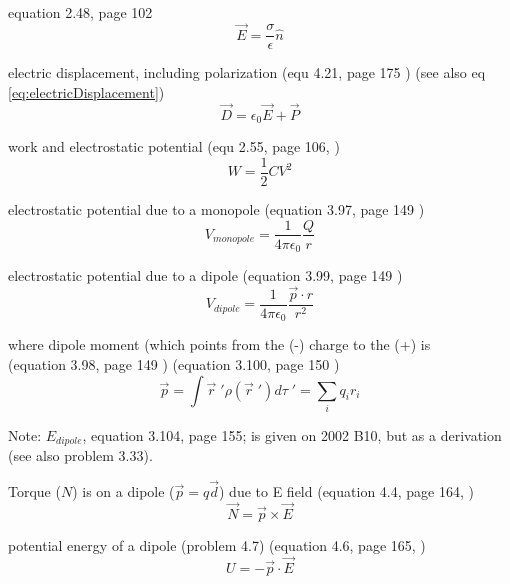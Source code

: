 \documentclass[12pt]{article}  %
\begin{document}
equation 2.48, page 102 \cite{GriffithED}
\begin{equation}
\vec{E} = \frac{\sigma}{\epsilon} \hat{n}
\end{equation}


electric displacement, including polarization (equ 4.21, page 175 \cite{GriffithED})
(see also eq \ref{eq:electricDisplacement})
\begin{equation}
\vec{D} = \epsilon_0 \vec{E} + \vec{P}
\label{eq:electricDisplacementwithPolarization}
\end{equation}

work and electrostatic potential (equ 2.55, page 106, \cite{GriffithED})
\begin{equation}
  W = \frac{1}{2} C V^2
	\label{eq:workCapacitor}
\end{equation}

electrostatic potential due to a monopole (equation 3.97, page 149  \cite{GriffithED})
\begin{equation}
V_{monopole} = \frac{1}{4 \pi \epsilon_0} \frac{Q}{r}
\end{equation}

electrostatic potential due to a dipole (equation 3.99, page 149  \cite{GriffithED})
\begin{equation}
V_{dipole} = \frac{1}{4 \pi \epsilon_0} \frac{\vec{p}\cdot \hat{r}}{r^2}
\end{equation}

where dipole moment (which points from the (-) charge to the (+) is \\ 
(equation 3.98, page 149  \cite{GriffithED}) (equation 3.100, page 150  \cite{GriffithED})
\begin{equation}
\vec{p} = \int \vec{r} \; ' \rho ( \vec{r}\;' ) d \tau \;' = \sum_i q_i r_i
\end{equation}

Note: $E_{dipole}$, equation 3.104, page 155; is given on 2002 B10,
but as a derivation (see also problem 3.33).

Torque ($N$) is on a dipole ($\vec{p}=q\vec{d}$) due to E field (equation 4.4, page 164, \cite{GriffithED})
\begin{equation}
\vec{N} = \vec{p} \times \vec{E}
\end{equation}

potential energy of a dipole (problem 4.7) (equation 4.6, page 165, \cite{GriffithED})
\begin{equation}
U = -\vec{p} \cdot \vec{E}
\end{equation}
\end{document}
